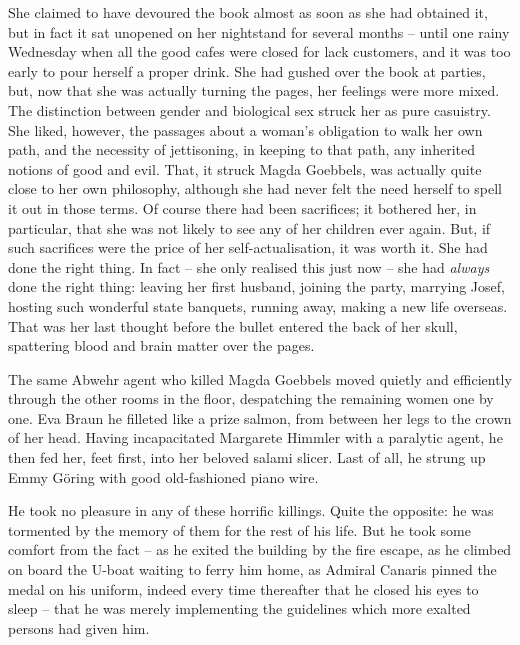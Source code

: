 She claimed to have devoured the book almost as soon as she had obtained it, but in fact it sat unopened on her nightstand for several months -- until one rainy Wednesday when all the good cafes were closed for lack customers, and it was too early to pour herself a proper drink. She had gushed over the book at parties, but, now that she was actually turning the pages, her feelings were more mixed. The distinction between gender and biological sex struck her as pure casuistry. She liked, however, the passages about a woman's obligation to walk her own path, and the necessity of jettisoning, in keeping to that path, any inherited notions of good and evil. That, it struck Magda Goebbels, was actually quite close to her own philosophy, although she had never felt the need herself to spell it out in those terms. Of course there had been sacrifices; it bothered her, in particular, that she was not likely to see any of her children ever again. But, if such sacrifices were the price of her self-actualisation, it was worth it. She had done the right thing. In fact -- she only realised this just now -- she had \emph{always} done the right thing: leaving her first husband, joining the party, marrying Josef, hosting such wonderful state banquets, running away, making a new life overseas. That was her last thought before the bullet entered the back of her skull, spattering blood and brain matter over the pages.

The same Abwehr agent who killed Magda Goebbels moved quietly and efficiently through the other rooms in the floor, despatching the remaining women one by one. Eva Braun he filleted like a prize salmon, from between her legs to the crown of her head. Having incapacitated Margarete Himmler with a paralytic agent, he then fed her, feet first, into her beloved salami slicer. Last of all, he strung up Emmy G\"oring with good old-fashioned piano wire.

He took no pleasure in any of these horrific killings. Quite the opposite: he was tormented by the memory of them for the rest of his life. But he took some comfort from the fact -- as he exited the building by the fire escape, as he climbed on board the U-boat waiting to ferry him home, as Admiral Canaris pinned the medal on his uniform, indeed every time thereafter that he closed his eyes to sleep -- that he was merely implementing the guidelines which more exalted persons had given him.
